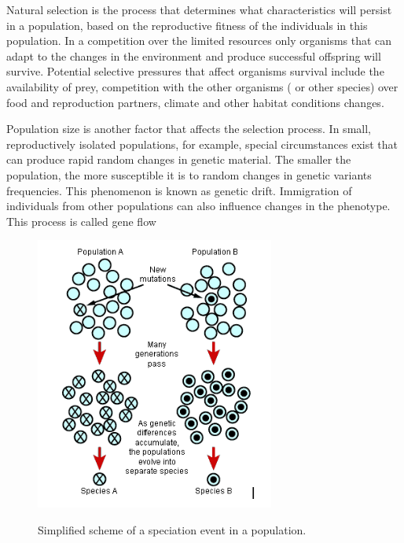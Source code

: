 \documentclass[11pt, a4paper,oneside]{report}
\begin{document}
Natural selection is the process that determines what characteristics will persist in a population, based on the reproductive fitness of the individuals in this population. In a competition over the limited resources only organisms that can adapt to the changes in the environment and produce successful offspring will survive. Potential selective pressures that affect organisms survival include the availability of prey, competition with the other organisms ( or other species) over food and reproduction partners, climate and other habitat conditions changes. 

Population size is another factor that affects the selection process.  In small, reproductively isolated populations, for example, special circumstances exist that can produce rapid random changes in genetic material. The smaller the population, the more susceptible it is to random changes in genetic variants frequencies.  This phenomenon is known as genetic drift. Immigration of individuals from other populations can also influence changes in the phenotype. This process is called gene flow\cite{Grant1980}

\begin{figure}[ht]
\begin{center}
\label{img:populations}
\includegraphics[width=0.7\textwidth]{figures/populations.png}
\end{center}
\caption{Simplified scheme of a speciation event in a population.} 
\end{figure}
\end{document}
